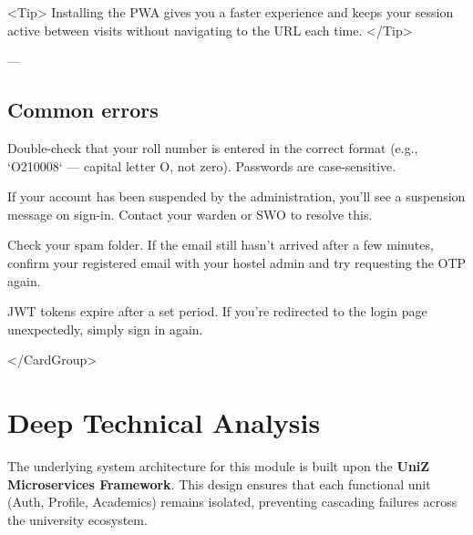 <Tip>
  Installing the PWA gives you a faster experience and keeps your session active
  between visits without navigating to the URL each time.
</Tip>

---

\subsection{Common errors}


\begin{tcolorbox}[colback=gray!5,colframe=primary,title=Documentation Note]

  
\begin{tcolorbox}[colback=gray!5,colframe=primary,title=Documentation Note]

    Double-check that your roll number is entered in the correct format (e.g.,
    `O210008` — capital letter O, not zero). Passwords are case-sensitive.
  
\end{tcolorbox}

  
\begin{tcolorbox}[colback=gray!5,colframe=primary,title=Documentation Note]

    If your account has been suspended by the administration, you'll see a
    suspension message on sign-in. Contact your warden or SWO to resolve this.
  
\end{tcolorbox}

  
\begin{tcolorbox}[colback=gray!5,colframe=primary,title=Documentation Note]

    Check your spam folder. If the email still hasn't arrived after a few
    minutes, confirm your registered email with your hostel admin and try
    requesting the OTP again.
  
\end{tcolorbox}

  
\begin{tcolorbox}[colback=gray!5,colframe=primary,title=Documentation Note]

    JWT tokens expire after a set period. If you're redirected to the login page
    unexpectedly, simply sign in again.
  
\end{tcolorbox}

</CardGroup>


\section{Deep Technical Analysis}
The underlying system architecture for this module is built upon the \textbf{UniZ Microservices Framework}. 
This design ensures that each functional unit (Auth, Profile, Academics) remains isolated, preventing cascading failures across the university ecosystem.


\end{tcolorbox}
